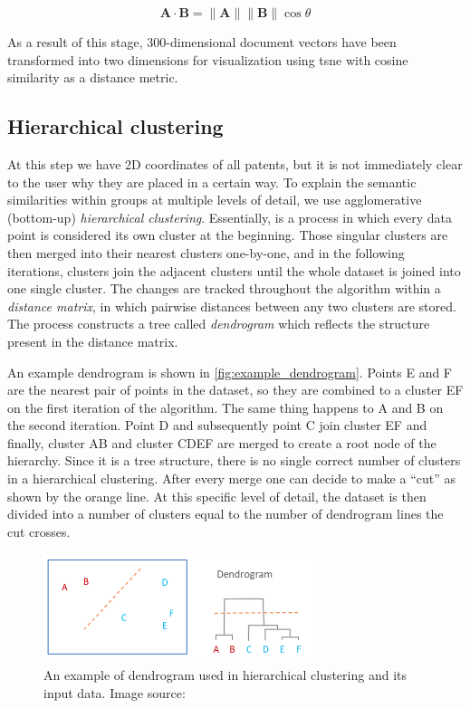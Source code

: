 \begin{equation} \label{eq:cosine}
\mathbf{A} \cdot \mathbf{B}=\|\mathbf{A}\|\|\mathbf{B}\| \cos \theta
\end{equation}

As a result of this stage, 300-dimensional document vectors have been transformed into two dimensions for visualization using \gls{tsne} with cosine similarity as a distance metric.

\subsection{Hierarchical clustering}
\label{subsec:hierarchical_clustering}

At this step we have 2D coordinates of all patents, but it is not immediately clear to the user why they are placed in a certain way. 
To explain the semantic similarities within groups at multiple levels of detail, we use agglomerative (bottom-up) \textit{hierarchical clustering}.
Essentially, is a process in which every data point is considered its own cluster at the beginning. 
Those singular clusters are then merged into their nearest clusters  one-by-one, and in the following iterations, clusters join the adjacent clusters until the whole dataset is joined into one single cluster.
The changes are tracked throughout the algorithm within a \textit{distance matrix}, in which pairwise distances between any two clusters are stored.
The process constructs a tree called \textit{dendrogram} which reflects the structure present in the distance matrix.

An example dendrogram is shown in \autoref{fig:example_dendrogram}.
Points E and F are the nearest pair of points in the dataset, so they are combined to a cluster EF on the first iteration of the algorithm.
The same thing happens to A and B on the second iteration.
Point D and subsequently point C join cluster EF and finally, cluster AB and cluster CDEF are merged to create a root node of the hierarchy.
Since it is a tree structure, there is no single correct number of clusters in a hierarchical clustering.
After every merge one can decide to make a ``cut'' as shown by the orange line.
At this specific level of detail, the dataset is then divided into a number of clusters equal to the number of dendrogram lines the cut crosses.

\begin{figure}[!]
\centering
\includegraphics[width=0.7\textwidth]{img/example_dendrogram}
\caption{An example of dendrogram used in hierarchical clustering and its input data. Image source: \cite{Bock}}
\label{fig:example_dendrogram}
\end{figure}


